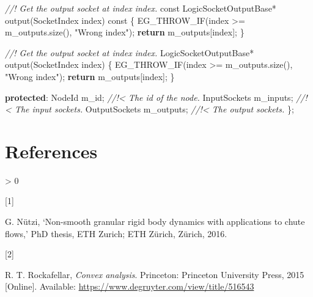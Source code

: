 \documentclass[
  12pt,
  british,
  a4paper,
  twoside,
  titlepage,
  openright,
  numbers=noenddot,
  chapterprefix=true,
  headings=optiontohead,
  svgnames,
  dvipsnames]{scrreprt}
\newenvironment{Shaded}{}{}
\newcommand{\AttributeTok}[1]{\textcolor[rgb]{0.49,0.56,0.16}{#1}}
\newcommand{\CommentTok}[1]{\textcolor[rgb]{0.38,0.63,0.69}{\textit{#1}}}
\newcommand{\ControlFlowTok}[1]{\textcolor[rgb]{0.00,0.44,0.13}{\textbf{#1}}}
\newcommand{\KeywordTok}[1]{\textcolor[rgb]{0.00,0.44,0.13}{\textbf{#1}}}
\newcommand{\NormalTok}[1]{#1}
\newcommand{\StringTok}[1]{\textcolor[rgb]{0.25,0.44,0.63}{#1}}
\newcommand{\VariableTok}[1]{\textcolor[rgb]{0.10,0.09,0.49}{#1}}
\newlength{\cslhangindent}
\newlength{\csllabelwidth}
\newenvironment{CSLReferences}[3] %
 {%
  \setlength{\parindent}{0pt}
  \ifodd #1 \everypar{\setlength{\hangindent}{\cslhangindent}}\ignorespaces\fi
  \ifnum #2 > 0
  \setlength{\parskip}{#2\baselineskip}
  \fi
 }%
 {}
\newcommand{\CSLLeftMargin}[1]{\parbox[t]{\csllabelwidth}{#1}}
\newcommand{\CSLRightInline}[1]{\parbox[t]{\linewidth - \csllabelwidth}{#1}}
\begin{document}
\begin{Shaded}
\begin{Highlighting}[numbers=left,,]
    \CommentTok{//! Get the output socket at index \textasciigrave{}index\textasciigrave{}.}
    \AttributeTok{const}\NormalTok{ LogicSocketOutputBase* output(SocketIndex index) }\AttributeTok{const}
\NormalTok{    \{}
\NormalTok{        EG\_THROW\_IF(index \textgreater{}= }\VariableTok{m\_outputs}\NormalTok{.size(), }\StringTok{"Wrong index"}\NormalTok{);}
        \ControlFlowTok{return} \VariableTok{m\_outputs}\NormalTok{[index];}
\NormalTok{    \}}

    \CommentTok{//! Get the output socket at index \textasciigrave{}index\textasciigrave{}.}
\NormalTok{    LogicSocketOutputBase* output(SocketIndex index)}
\NormalTok{    \{}
\NormalTok{        EG\_THROW\_IF(index \textgreater{}= }\VariableTok{m\_outputs}\NormalTok{.size(), }\StringTok{"Wrong index"}\NormalTok{);}
        \ControlFlowTok{return} \VariableTok{m\_outputs}\NormalTok{[index];}
\NormalTok{    \}}

\KeywordTok{protected}\NormalTok{:}
\NormalTok{    NodeId }\VariableTok{m\_id}\NormalTok{;              }\CommentTok{//!\textless{} The id of the node.}
\NormalTok{    InputSockets }\VariableTok{m\_inputs}\NormalTok{;    }\CommentTok{//!\textless{} The input sockets.}
\NormalTok{    OutputSockets }\VariableTok{m\_outputs}\NormalTok{;  }\CommentTok{//!\textless{} The output sockets.}
\NormalTok{\};}
\end{Highlighting}
\end{Shaded}

\hypertarget{references}{%
\chapter*{References}\label{references}}

\hypertarget{refs}{}
\begin{CSLReferences}{0}{0}
\leavevmode\hypertarget{ref-nuetzig_thesis_2016}{}%
\CSLLeftMargin{{[}1{]} }
\CSLRightInline{G. Nützi, {`Non-smooth granular rigid body dynamics with
applications to chute flows,'} PhD thesis, ETH Zurich; ETH Zürich,
Zürich, 2016. }

\leavevmode\hypertarget{ref-rockafellar_convex_2015}{}%
\CSLLeftMargin{{[}2{]} }
\CSLRightInline{R. T. Rockafellar, \emph{Convex analysis}. Princeton:
Princeton University Press, 2015 {[}Online{]}. Available:
\url{https://www.degruyter.com/view/title/516543}}

\end{CSLReferences}
\end{document}
